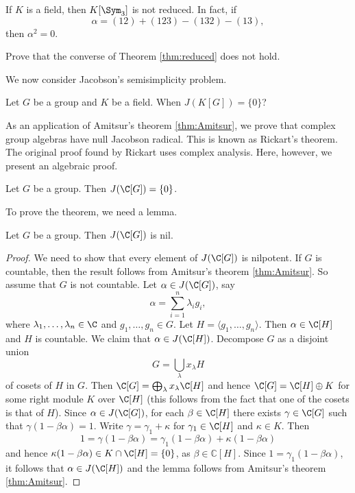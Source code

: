 \begin{example}
    If $K$ is a field, then $K[\Sym_3]$ is not reduced. 
    In fact, 
    if 
    \[
    \alpha=(12)+(123)-(132)-(13),
    \]
    then 
    $\alpha^2=0$. 
\end{example}

\begin{exercise}
    Prove that the converse of Theorem \ref{thm:reduced} 
    does not hold. 
\end{exercise}



We now consider Jacobson's semisimplicity problem. 

\begin{openproblem}
\label{Jacobson's semisimplicity problem}
Let $G$ be a group and $K$ be a field. When $J(K[G])=\{0\}$?
\end{openproblem}

As an application of Amitsur's theorem \ref{thm:Amitsur}, 
we prove that 
complex group algebras have null Jacobson radical.
This is known as 
Rickart's theorem. The original proof found by Rickart 
uses complex analysis. Here, however, 
we present an algebraic proof. 

\begin{theorem}[Rickart]
\label{thm:Rickart}
    Let $G$ be a group. Then $J(\C[G])=\{0\}$.
\end{theorem}

To prove the theorem, we need a lemma.

\begin{lemma}
Let $G$ be a group. Then $J(\C[G])$ is nil.        
\end{lemma}

\begin{proof}
    We need to show that every element of $J(\C[G])$ is nilpotent. 
    If $G$ is countable, then the result follows from Amitsur's theorem \ref{thm:Amitsur}. So assume that 
    $G$ is not countable. Let $\alpha\in J(\C[G])$, say
    \[
    \alpha=\sum_{i=1}^n\lambda_ig_i,
    \]
    where $\lambda_1,\dots,\lambda_n\in\C$ and $g_1,\dots,g_n\in G$. Let $H=\langle g_1,\dots,g_n\rangle$.
    Then $\alpha\in \C[H]$ and $H$ is countable. We claim that $\alpha\in J(\C[H])$. Decompose
    $G$ as a disjoint union 
    \[
    G=\bigcup_\lambda x_\lambda H
    \]
    of cosets of $H$ in $G$. Then $\C[G]=\bigoplus_\lambda x_\lambda\C[H]$ and
    hence $\C[G]=\C[H]\oplus K$ for some right module $K$ over $\C[H]$ (this follows
    from the fact that one of the cosets is that of $H$). Since $\alpha\in J(\C[G])$, for each 
    $\beta\in\C[H]$ there exists $\gamma\in\C[G]$ such that 
    $\gamma(1-\beta\alpha)=1$. Write $\gamma=\gamma_1+\kappa$ for $\gamma_1\in\C[H]$ and $\kappa\in K$. Then
    \[
    1=\gamma(1-\beta\alpha)=\gamma_1(1-\beta\alpha)+\kappa(1-\beta\alpha)
    \]
    and hence $\kappa(1-\beta\alpha)\in K\cap \C[H]=\{0\}$, as $\beta\in\mathbb{C}[H]$. 
    Since $1=\gamma_1(1-\beta\alpha)$, it follows that
    $\alpha\in J(\C[H])$ and the lemma follows from Amitsur's theorem \ref{thm:Amitsur}.  
\end{proof}

